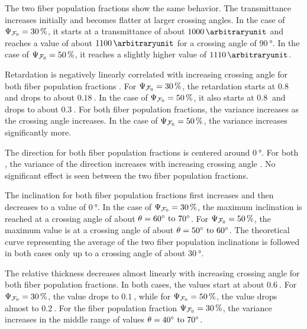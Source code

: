 The two fiber population fractions \modelPsi{} show the same behavior.
The transmittance increases initially and becomes flatter at larger crossing angles.
In the case of $\textnormal{$\Psi_{\textnormal{$\mathcal{F}_0$}}$} = \SI{30}{\percent}$, it starts at a transmittance of about $\SI{1000}{\arbitraryunit}$ and reaches a value of about $\SI{1100}{\arbitraryunit}$ for a crossing angle of $\SI{90}{\degree}$.
In the case of $\textnormal{$\Psi_{\textnormal{$\mathcal{F}_0$}}$} = \SI{50}{\percent}$, it reaches a slightly higher value of $\SI{1110}{\arbitraryunit}$.
\par
Retardation is negatively linearly correlated with increasing crossing angle for both fiber population fractions \modelPsi{}.
For $\textnormal{$\Psi_{\textnormal{$\mathcal{F}_0$}}$}=\SI{30}{\percent}$, the retardation starts at $\SI{0.8}{}$ and drops to about $\SI{0.18}{}$.
In the case of $\textnormal{$\Psi_{\textnormal{$\mathcal{F}_0$}}$}=\SI{50}{\percent}$, it also starts at $\SI{0.8}{}$ and drops to about $\SI{0.3}{}$.
For both fiber population fractions, the variance increases as the crossing angle increases.
In the case of $\textnormal{$\Psi_{\textnormal{$\mathcal{F}_0$}}$}=\SI{50}{\percent}$, the variance increases significantly more.
\par
The direction for both fiber population fractions \modelPsi{} is centered around $\SI{0}{\degree}$.
For both \modelPsi{}, the variance of the direction increases with increasing crossing angle \modelOmega{}.
No significant effect is seen between the two fiber population fractions.
\par
The inclination for both fiber population fractions first increases and then decreases to a value of $\SI{0}{\degree}$.
In the case of $\textnormal{$\Psi_{\textnormal{$\mathcal{F}_0$}}$}=\SI{30}{\percent}$, the maximum inclination is reached at a crossing angle of about $\modelOmega=\SIrange{60}{70}{\degree}$.
For $\textnormal{$\Psi_{\textnormal{$\mathcal{F}_0$}}$}=\SI{50}{\percent}$, the maximum value is at a crossing angle of about $\modelOmega=\SIrange{50}{60}{\degree}$.
The theoretical curve representing the average of the two fiber population inclinations is followed in both cases only up to a crossing angle of about $\SI{30}{\degree}$.
\par
The relative thickness \trel{} decreases almost linearly with increasing crossing angle \modelOmega{} for both fiber population fractions.
In both cases, the \trel{} values start at about $\SI{0.6}{}$.
For $\textnormal{$\Psi_{\textnormal{$\mathcal{F}_0$}}$} = \SI{30}{\percent}$, the \trel{} value drops to $\SI{0.1}{}$, while for $\textnormal{$\Psi_{\textnormal{$\mathcal{F}_0$}}$} = \SI{50}{\percent}$, the \trel{} value drops almost to $\SI{0.2}{}$.
For the fiber population fraction $\textnormal{$\Psi_{\textnormal{$\mathcal{F}_0$}}$} = \SI{30}{\percent}$, the variance increases in the middle range of values $\modelOmega=\SIrange{40}{70}{\degree}$.
